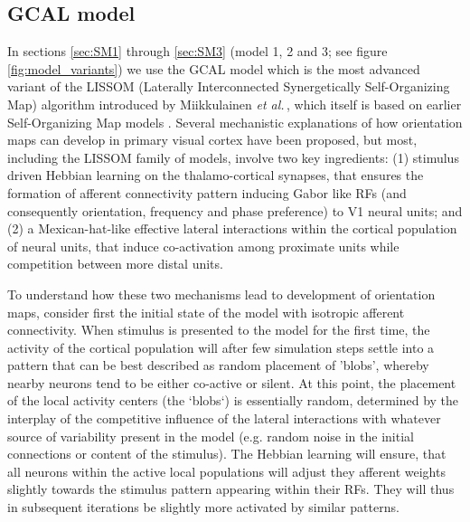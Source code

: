 \documentclass[utf8]{frontiersSCNS}
\newcommand{\etal}{\textit{et al.}}
\begin{document}
\subsection{GCAL model}\label{sec:gcal}

In sections \ref{sec:SM1} through \ref{sec:SM3} (model 1, 2 and 3; see figure \ref{fig:model_variants}) we use the GCAL model \citep{Stevens2013}  which is the most advanced variant of the LISSOM (Laterally Interconnected Synergetically Self-Organizing Map) algorithm introduced by Miikkulainen \etal\,\citep{CMVC}, which itself is based on earlier Self-Organizing Map models \citep{Kohonen1982}. Several mechanistic explanations of how orientation
maps can develop in primary visual cortex have been proposed, but most, including the LISSOM family of models, involve two key ingredients: (1) stimulus
driven Hebbian learning on the thalamo-cortical synapses, that ensures the formation of afferent connectivity pattern inducing Gabor like RFs (and consequently orientation, frequency and phase preference) to V1 neural units; and (2) a Mexican-hat-like effective lateral interactions within the  cortical population of neural units, that induce co-activation among proximate units while competition between more distal units. 

To understand how these two mechanisms lead to development of orientation maps, consider first the initial state of the model with isotropic afferent connectivity. When stimulus is presented to the model for the first time, the activity of the cortical population will after few simulation steps settle into a pattern that can be best described as random placement of 'blobs', whereby nearby neurons tend to be either co-active or silent. At this point, the placement of the local activity centers (the `blobs`) is essentially random, determined by the interplay of the competitive influence of the lateral interactions with whatever source of variability present in the model (e.g. random noise in the initial connections or content of the stimulus). The Hebbian learning will ensure, that all neurons within the active local populations will adjust they afferent weights slightly towards the stimulus pattern appearing within their RFs. They will thus in subsequent iterations be slightly more activated by similar patterns. 
\end{document}

